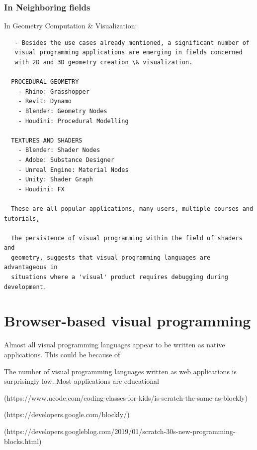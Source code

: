 \subsubsection*{ In Neighboring fields }
In Geometry Computation \& Visualization:

\begin{lstlisting} 
   - Besides the use cases already mentioned, a significant number of 
   visual programming applications are emerging in fields concerned 
   with 2D and 3D geometry creation \& visualization. 

  PROCEDURAL GEOMETRY 
    - Rhino: Grasshopper
    - Revit: Dynamo  
    - Blender: Geometry Nodes
    - Houdini: Procedural Modelling
  
  TEXTURES AND SHADERS
    - Blender: Shader Nodes
    - Adobe: Substance Designer
    - Unreal Engine: Material Nodes
    - Unity: Shader Graph
    - Houdini: FX

  These are all popular applications, many users, multiple courses and tutorials, 

  The persistence of visual programming within the field of shaders and
  geometry, suggests that visual programming languages are advantageous in
  situations where a 'visual' product requires debugging during development. 
\end{lstlisting}



\section{Browser-based visual programming}
\label{sec:related-webvpl}

Almost all visual programming languages appear to be written as native applications. 
This could be because of 


The number of visual programming languages written as web applications is surprisingly low. 
Most applications are educational


(https://www.ucode.com/coding-classes-for-kids/is-scratch-the-same-as-blockly)

(https://developers.google.com/blockly/)

(https://developers.googleblog.com/2019/01/scratch-30s-new-programming-blocks.html)

